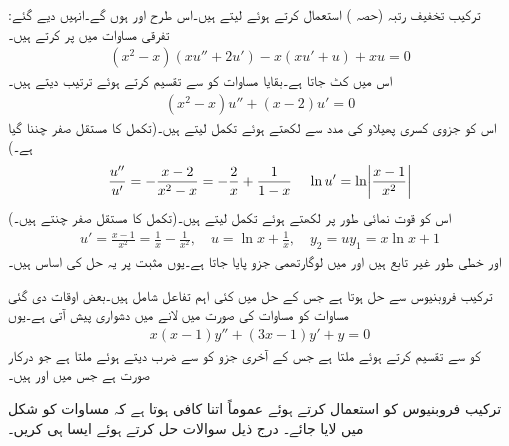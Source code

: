 :ترکیب تخفیف رتبہ (حصہ ) استعمال کرتے ہوئے  لیتے ہیں۔اس طرح  اور  ہوں گے۔انہیں دیے گئے تفرقی مساوات میں پر کرتے ہیں۔
\begin{align*}
(x^2-x)(xu''+2u')-x(xu'+u)+xu=0
\end{align*}
اس میں  کٹ جاتا ہے۔بقایا مساوات کو  سے تقسیم کرتے ہوئے ترتیب دیتے ہیں۔
\begin{align*}
(x^2-x)u''+(x-2)u'=0
\end{align*}
اس کو جزوی کسری پھیلاو کی مدد سے لکھتے ہوئے تکمل لیتے ہیں۔(تکمل کا مستقل صفر چننا گیا ہے۔)
\begin{align*}
\frac{u''}{u'}=-\frac{x-2}{x^2-x}=-\frac{2}{x}+\frac{1}{1-x}\,\quad \ln u'=\ln \abs{\frac{x-1}{x^2}}
\end{align*}
اس کو قوت نمائی طور پر لکھتے ہوئے تکمل لیتے ہیں۔(تکمل کا مستقل صفر چنتے ہیں۔)
\begin{align*}
u'=\frac{x-1}{x^2}=\frac{1}{x}-\frac{1}{x^2}, \quad u=\ln x+\frac{1}{x}, \quad y_2=uy_1=x\ln x+1
\end{align*}
 اور  خطی طور غیر تابع ہیں اور  میں لوگارتھمی جزو پایا جاتا ہے۔یوں مثبت  پر یہ حل کی اساس ہیں۔

ترکیب فروبنیوس سے  حل ہوتا ہے جس کے حل میں کئی اہم تفاعل شامل ہیں۔بعض اوقات دی گئی مساوات کو مساوات  کی صورت میں لانے میں دشواری پیش آتی ہے۔یوں 
\begin{align*}
x(x-1)y''+(3x-1)y'+y=0
\end{align*}
کو  سے تقسیم کرتے ہوئے   ملتا ہے جس کے آخری جزو کو  سے ضرب دیتے ہوئے  ملتا ہے جو درکار صورت ہے جس میں  اور  ہیں۔ 

ترکیب فروبنیوس کو استعمال کرتے ہوئے عموماً اتنا کافی ہوتا ہے کہ مساوات کو  شکل میں لایا جائے۔ درج ذیل سوالات حل کرتے ہوئے ایسا ہی کریں۔


